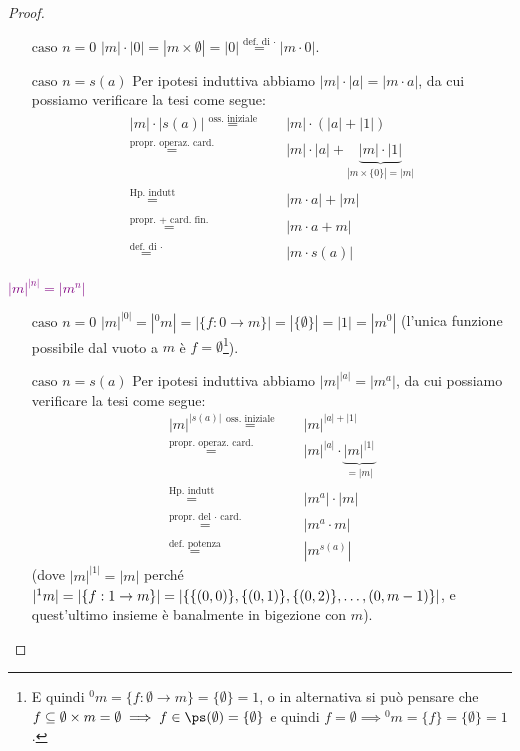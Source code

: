 \documentclass[11pt]{scrartcl}
\begin{document}
\begin{proof}
\begin{itemize}
		\item[$\boxed{\text{caso $n = 0$}}$] $|m| \cdot |0| =  |m \times \emptyset| = |0| \overset{\text{def. di $\cdot$}}{=} |m \cdot 0|$.
		\item[$\boxed{\text{caso $n = s(a)$}}$] Per ipotesi induttiva abbiamo $|m|\cdot|a| = |m \cdot a|$, da cui possiamo verificare la tesi come segue:
		\[ \begin{split}
			|m| \cdot |s(a)| \overset{\text{oss. iniziale}}{=}\quad& |m| \cdot (|a| + |1|) \\
						 \overset{\text{propr. operaz. card.}}{=}& |m| \cdot |a| + \underbrace{|m| \cdot |1|}_{|m \times \{0\}| = |m|} \\
						 \overset{\text{Hp. indutt}}{=}\quad& |m \cdot a| + |m| \\
						 \overset{\text{propr. $+$ card. fin.}}{=}\quad& |m \cdot a + m| \\
						 \overset{\text{def. di $\cdot$}}{=}\quad\;& |m \cdot s(a)|
 		\end{split} 
			\]
	\end{itemize}
	\textcolor{purple}{$|m|^{|n|} = |m^n|$}
	\begin{itemize}
		\item[$\boxed{\text{caso $n = 0$}}$] $|m|^{|0|} =  |{}^{0}m| = |\{f : 0 \rightarrow m\}| = |\{\emptyset\}| =  |1| = |m^0|$ (l'unica funzione possibile dal vuoto a $m$ è $f = \emptyset$\footnote{E quindi ${}^0m = \{f : \emptyset \rightarrow m\} = \{\emptyset\} = 1$, o in alternativa si può pensare che
		$f \subseteq \emptyset \times m = \emptyset \implies f \in \ps(\emptyset) = \{\emptyset\}$ e quindi $f = \emptyset \implies {}^0m = \{f\} = \{\emptyset\} = 1$.}).
		\item[$\boxed{\text{caso $n = s(a)$}}$] Per ipotesi induttiva abbiamo $|m|^{|a|} = |m^a|$, da cui possiamo verificare la tesi come segue:
		\[ \begin{split}
			|m|^{|s(a)|} \overset{\text{oss. iniziale}}{=}\quad& |m|^{|a| + |1|} \\
						 \overset{\text{propr. operaz. card.}}{=}& |m|^{|a|} \cdot \underbrace{|m|^{|1|}}_{=|m|} \\
						 \overset{\text{Hp. indutt}}{=}\quad& |m^a| \cdot |m| \\
						 \overset{\text{propr. del $\cdot$ card.}}{=}\quad& |m^a \cdot m| \\
						 \overset{\text{def. potenza}}{=}\quad\;& |m^{s(a)}|
 		\end{split} 
			\]
		(dove $|m|^{|1|} = |m|$ perché $|{}^{1}m|  = |\{f : 1 \rightarrow m\}| = |\{\{(0,0)\},\{(0,1)\},\{(0,2)\},\ldots,\linebreak(0,m-1)\}|$, e quest'ultimo insieme è banalmente in bigezione con $m$).
	\end{itemize}
\end{proof}
\end{document}
